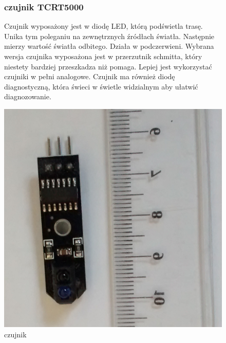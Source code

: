 \documentclass[a4paper,11pt]{article}
\def\SCALE{0.6}
\begin{document}
\begin{figure}[H]
	\subsubsection{czujnik TCRT5000}
	Czujnik wyposażony jest w diodę LED, którą podświetla trasę. Unika tym poleganiu na zewnętrznych źródłach światła. Następnie mierzy wartość światła odbitego. Działa w podczerwieni.
	Wybrana wersja czujnika wyposażona jest w przerzutnik schmitta, który niestety bardziej przeszkadza niż pomaga. Lepiej jest wykorzystać czujniki w pełni analogowe. Czujnik ma również diodę diagnostyczną, która świeci w świetle widzialnym aby ułatwić diagnozowanie.
	
	\centering
	\includegraphics[width=\SCALE
	\paperwidth]{czujnik}
	\caption{czujnik}

\end{figure}
\end{document}
